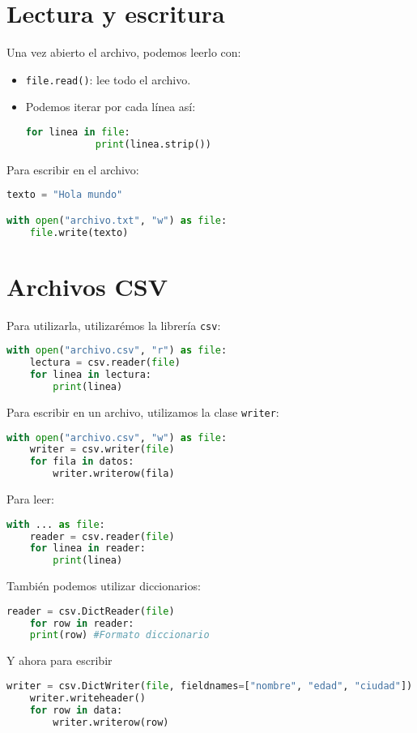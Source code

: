 \documentclass{./Programacion.tex}
\begin{document}
\section{Lectura y escritura}
Una vez abierto el archivo, podemos leerlo con:
\begin{itemize}
	\item \verb|file.read()|: lee todo el archivo.
	\item Podemos iterar por cada línea así:
		\begin{lstlisting}[language=python]
		for linea in file:
			print(linea.strip())
		\end{lstlisting}
\end{itemize}
Para escribir en el archivo:
\begin{lstlisting}[language=python]
texto = "Hola mundo"

with open("archivo.txt", "w") as file:
	file.write(texto)
\end{lstlisting}
\section{Archivos CSV}	
Para utilizarla, utilizarémos la librería \verb|csv|:
\begin{lstlisting}[language=python]
with open("archivo.csv", "r") as file:
	lectura = csv.reader(file)
	for linea in lectura:
		print(linea)
\end{lstlisting}
Para escribir en un archivo, utilizamos la clase \verb|writer|:
\begin{lstlisting}[language=python]
with open("archivo.csv", "w") as file:
	writer = csv.writer(file)
	for fila in datos:
		writer.writerow(fila)
\end{lstlisting}
Para leer:
\begin{lstlisting}[language=python]
with ... as file:
	reader = csv.reader(file)
	for linea in reader:
		print(linea)
\end{lstlisting}
También podemos utilizar diccionarios:
\begin{lstlisting}[language=python]
	reader = csv.DictReader(file)
	for row in reader:
	print(row) #Formato diccionario
\end{lstlisting}
Y ahora para escribir
\begin{lstlisting}[language=python]
	writer = csv.DictWriter(file, fieldnames=["nombre", "edad", "ciudad"])
	writer.writeheader()
	for row in data:
		writer.writerow(row)
\end{lstlisting}
\end{document}
